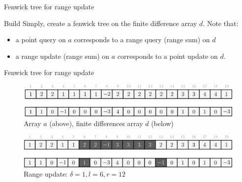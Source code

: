\documentclass{beamer}
\begin{document}
\begin{frame}{Fenwick tree for range update}
\begin{block}{Build}
Simply, create a fenwick tree on the finite difference array $d$. Note that:
\begin{itemize}
\item a point query on $a$ corresponds to a range query (range sum) on $d$
\item a range update (range sum) on $a$ corresponds to a point update on $d$.
\end{itemize}
\end{block}
\end{frame}
\begin{frame}[fragile]{Fenwick tree for range update}
\begin{figure}
\includegraphics[width=\textwidth]{fenwick4.png}
\caption{Array $a$ (above), finite differences array $d$ (below)}
\end{figure}
\begin{figure}
\includegraphics[width=\textwidth]{fenwick5.png}
\caption{Range update: $\delta = 1, l = 6, r = 12$}
\end{figure}
\end{frame}
\end{document}
